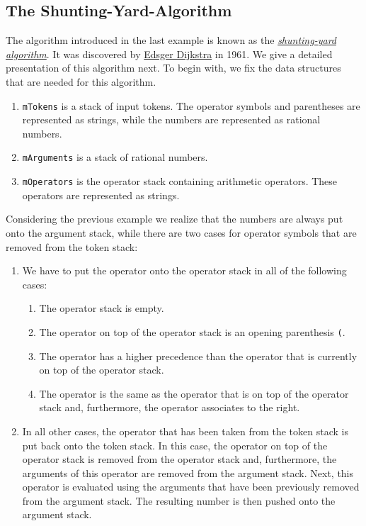 \subsection{The Shunting-Yard-Algorithm \label{algo-arith}}
The algorithm introduced in the last example is known as the 
\href{http://en.wikipedia.org/wiki/Shunting-yard_algorithm}{\emph{shunting-yard algorithm}}.
It was discovered by  \href{http://en.wikipedia.org/wiki/Edsger_Dijkstra}{Edsger Dijkstra} in 1961.
We give a detailed presentation of this algorithm next.  To begin with, we fix the data structures
that are needed for this algorithm.
\begin{enumerate}
\item \texttt{mTokens} is a stack of input tokens.  The operator symbols and parentheses are
      represented as strings, while the numbers are represented as rational numbers.
\item \texttt{mArguments} is a stack of rational numbers.  
\item \texttt{mOperators} is the operator stack containing arithmetic operators.  These operators
      are represented as strings.
\end{enumerate}
Considering the previous example we realize that the numbers are always put onto the argument stack,
while there are two cases for operator symbols that are removed from the token stack:
\begin{enumerate}
\item We have to put the operator onto the operator stack in all of the following cases:
      \begin{enumerate}
      \item The operator stack is empty.
      \item The operator on top of the operator stack is an opening parenthesis \texttt{(}. 
      \item The operator has a higher precedence than the operator that is currently on top of the
            operator stack.
      \item The operator is the same as the operator that is on top of the operator stack and, furthermore,
            the operator associates to the right.
      \end{enumerate}
\item In all other cases, the operator that has been taken from the token stack is put back onto the
      token stack.  In this case, the operator on top of the operator stack is removed from the
      operator stack and, furthermore, the arguments of this operator are removed from the argument
      stack.  Next, this operator is evaluated using the arguments that have been previously removed
      from the argument stack.   The resulting number is then pushed onto the argument stack.
\end{enumerate}


